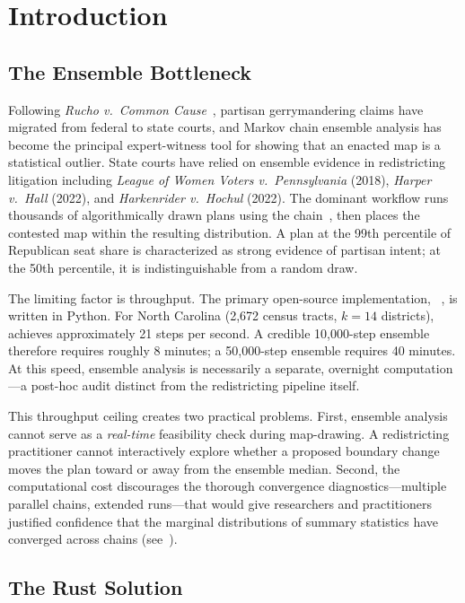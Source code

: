 \section{Introduction}
\label{sec:introduction}

\subsection{The Ensemble Bottleneck}

Following \textit{Rucho v.\ Common Cause}~\citep{scotus2019rucho}, partisan
gerrymandering claims have migrated from federal to state courts, and Markov
chain ensemble analysis has become the principal expert-witness tool for
showing that an enacted map is a statistical outlier.
State courts have relied on ensemble evidence in redistricting litigation
including \textit{League of Women Voters v.\ Pennsylvania} (2018),
\textit{Harper v.\ Hall} (2022), and \textit{Harkenrider v.\ Hochul} (2022).
The dominant workflow runs thousands of algorithmically drawn plans using
the \recom{} chain~\citep{deford2021recombination}, then places the contested
map within the resulting distribution.
A plan at the 99th percentile of Republican seat share is characterized as
strong evidence of partisan intent; at the 50th percentile, it is
indistinguishable from a random draw.

The limiting factor is throughput.
The primary open-source implementation, \gc{}~\citep{gerrychain2021},
is written in Python.
For North Carolina (2{,}672 census tracts, $k=14$ districts), \gc{}
achieves approximately 21 steps per second.
A credible 10{,}000-step ensemble therefore requires roughly 8 minutes;
a 50{,}000-step ensemble requires 40 minutes.
At this speed, ensemble analysis is necessarily a separate, overnight
computation---a post-hoc audit distinct from the redistricting pipeline
itself.

This throughput ceiling creates two practical problems.
First, ensemble analysis cannot serve as a \emph{real-time} feasibility
check during map-drawing.
A redistricting practitioner cannot interactively explore whether a
proposed boundary change moves the plan toward or away from the ensemble
median.
Second, the computational cost discourages the thorough convergence
diagnostics---multiple parallel chains, extended runs---that would give
researchers and practitioners justified confidence that the marginal
distributions of summary statistics have converged across chains
(see~\citealt{dellaLibera2026g4}).

\subsection{The Rust Solution}

